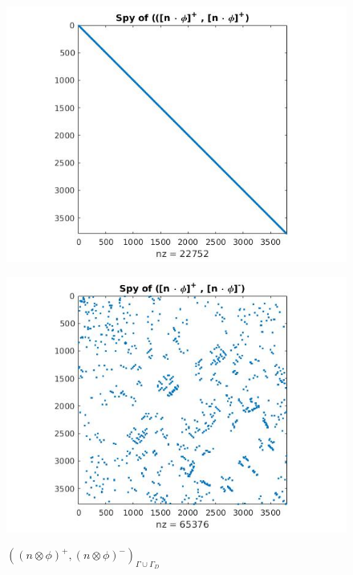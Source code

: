 \documentclass[a4paper]{book}
\begin{document}
\begin{figure}[H]
  \begin{minipage}[c]{0.5\textwidth}
    \includegraphics[width=\textwidth]{figure21.jpg}
    \label{fig:figure21}
	\caption{$((n \otimes \phi)^+,(n \otimes \phi)^+)_{\Gamma \cup \Gamma_D}$}      
  \end{minipage}\hfill
  \begin{minipage}[c]{0.5\textwidth}
    \includegraphics[width=\textwidth]{figure22.jpg}
    \label{fig:figure22}
	\caption{$((n \otimes \phi)^+,(n \otimes \phi)^-)_{\Gamma \cup \Gamma_D}$}      
  \end{minipage}\hfill
    \begin{minipage}[c]{0.5\textwidth}

\end{minipage}
\end{figure}
\end{document}
